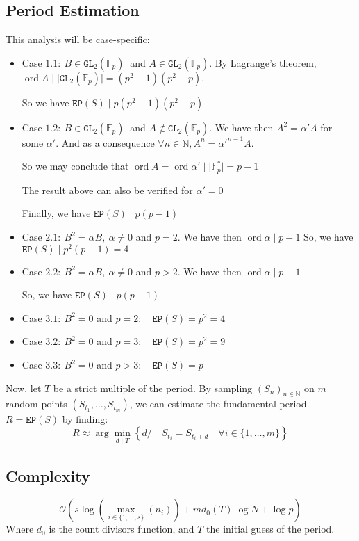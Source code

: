 \documentclass[]{article}
\DeclareMathOperator{\ord}{ord}
\begin{document}
\subsection{Period Estimation}
This analysis will be case-specific:
\begin{itemize}
	\item Case $1.1: \ B\in\mathtt{GL}_2(\mathbb{F}_p) \ $ and $A\in\mathtt{GL}_2(\mathbb{F}_p)$. By Lagrange's theorem, $\ord A  \mid  \lvert \mathtt{GL}_2(\mathbb{F}_p)\rvert=(p^2-1)(p^2-p).$  
	
	So we have $\mathtt{EP}(S) \mid p(p^2-1)(p^2-p)$
	\item Case $1.2: \ B\in\mathtt{GL}_2(\mathbb{F}_p) \ $ and $A\notin\mathtt{GL}_2(\mathbb{F}_p).$ We have then $A^2=\alpha'A$ for some $\alpha'.$ And as a consequence $\forall n\in\mathbb{N},A^n=\alpha'^{n-1}A.$
	
	So we may conclude that $\ord A = \ord \alpha' \mid \lvert \mathbb{F}_p^* \rvert = p-1$ 
	
	The result above can also be verified for $\alpha'=0$
	
	Finally, we have $\mathtt{EP}(S) \mid p(p-1)$
	\item Case $2.1: \ B^2=\alpha B, \ \alpha\neq 0 $ and $p=2.$ We have then $\ord \alpha \mid p-1$
	So, we have $\mathtt{EP}(S) \mid p^2(p-1)=4$
	\item Case $2.2: \ B^2=\alpha B, \ \alpha\neq 0 $ and $p>2.$ We have then $\ord \alpha \mid p-1$

	So, we have $\mathtt{EP}(S) \mid p(p-1)$
	\item Case $3.1: \ B^2=0$ and $p=2: \quad \mathtt{EP}(S)=p^2=4$
	\item Case $3.2: \ B^2=0$ and $p=3:\quad \mathtt{EP}(S)=p^2=9$
	\item Case $3.3: \ B^2=0$ and $p>3:\quad \mathtt{EP}(S)=p$
\end{itemize} 
Now, let $T$ be a strict multiple of the period. By sampling $(S_n)_{n\in\mathbb{N}}$ on $m$ random points $(S_{t_1},\dots,S_{t_m})$, we can estimate the fundamental period $R=\mathtt{EP}(S)$ by finding:
\begin{equation}\tag{2}
\boxed{R\approx \arg\min_{d \mid T}\left\{d/\quad S_{t_i} = S_{t_i+d} \quad \forall i\in\{1,\dots,m\}\right\}}
\end{equation}
\subsection{Complexity}
$$
\mathcal{O}\left(s\log\left(\max_{i\in\{1,\dots,s\}}(n_{i})\right)+md_0(T)\log N+ \log p\right)
$$
Where $d_0$ is the count divisors function, and $T$ the initial guess of the period. 
\pagebreak
\end{document}
